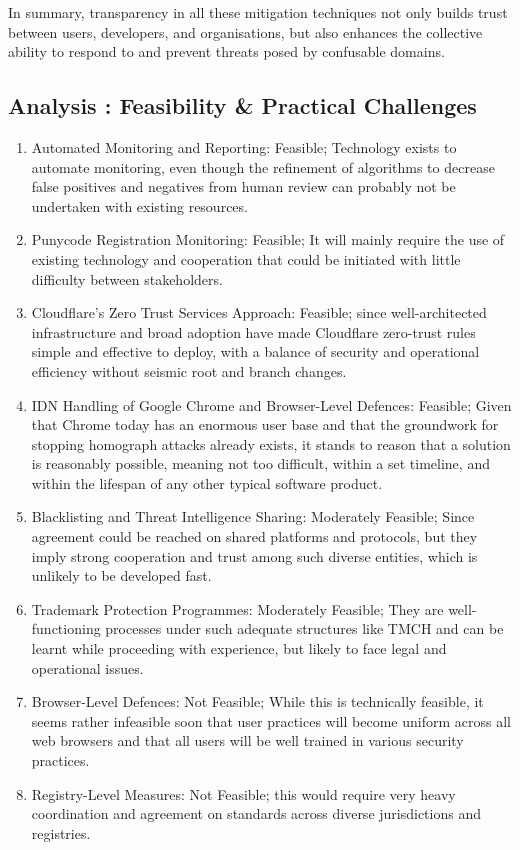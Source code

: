 In summary, transparency in all these mitigation techniques not only builds trust between users, developers, and organisations, but also enhances the collective ability to respond to and prevent threats posed by confusable domains.


\subsection{ Analysis : Feasibility \& Practical Challenges}

 \begin{enumerate}
  \item Automated Monitoring and Reporting: Feasible; Technology exists to automate monitoring, even though the refinement of algorithms to decrease false positives and negatives from human review can probably not be undertaken with existing resources.
  \item  Punycode Registration Monitoring: Feasible; It will mainly require the use of existing technology and cooperation that could be initiated with little difficulty between stakeholders.
   \item Cloudflare's Zero Trust Services Approach: Feasible; since well-architected infrastructure and broad adoption have made Cloudflare zero-trust rules simple and effective to deploy, with a balance of security and operational efficiency without seismic root and branch changes.
  \item IDN Handling of Google Chrome and Browser-Level Defences: Feasible; Given that Chrome today has an enormous user base and that the groundwork for stopping homograph attacks already exists, it stands to reason that a solution is reasonably possible, meaning not too difficult, within a set timeline, and within the lifespan of any other typical software product.
  \item Blacklisting and Threat Intelligence Sharing: Moderately Feasible; Since agreement could be reached on shared platforms and protocols, but they imply strong cooperation and trust among such diverse entities, which is unlikely to be developed fast.
  \item Trademark Protection Programmes: Moderately Feasible; They are well-functioning processes under such adequate structures like TMCH and can be learnt while proceeding with experience, but likely to face legal and operational issues.
  \item  Browser-Level Defences: Not Feasible; While this is technically feasible, it seems rather infeasible soon that user practices will become uniform across all web browsers and that all users will be well trained in various security practices.
  \item Registry-Level Measures: Not Feasible; this would require very heavy coordination and agreement on standards across diverse jurisdictions and registries.
 

  
\end{enumerate}

